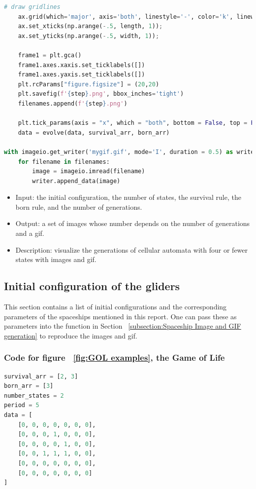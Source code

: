 \documentclass[12pt]{article}
\numberwithin{figure}{section} %
\begin{document}
\begin{lstlisting}[language = Python]
    # draw gridlines
    ax.grid(which='major', axis='both', linestyle='-', color='k', linewidth=2)
    ax.set_xticks(np.arange(-.5, length, 1));
    ax.set_yticks(np.arange(-.5, width, 1));

    frame1 = plt.gca()
    frame1.axes.xaxis.set_ticklabels([])
    frame1.axes.yaxis.set_ticklabels([])
    plt.rcParams["figure.figsize"] = (20,20)
    plt.savefig(f'{step}.png', bbox_inches='tight')
    filenames.append(f'{step}.png')
    
    plt.tick_params(axis = "x", which = "both", bottom = False, top = False)
    data = evolve(data, survival_arr, born_arr)

with imageio.get_writer('mygif.gif', mode='I', duration = 0.5) as writer:
    for filename in filenames:
        image = imageio.imread(filename)
        writer.append_data(image)
\end{lstlisting}
\vspace{-1.5em}
\begin{itemize}[leftmargin = 0.5cm, topsep=0pt,itemsep=-1ex,partopsep=1ex,parsep=1ex]
\item Input: the initial configuration, the number of states, the survival rule, the born rule, and the number of generations. 
\item Output: a set of images whose number depends on the number of generations and a gif. 
\item Description: visualize the generations of cellular automata with four or fewer states with images and gif. 
\end{itemize}

\subsection{Initial configuration of the gliders}
\label{subsection:Initial configuration of the spaceships}
This section contains a list of initial configurations and the corresponding parameters of the spaceships mentioned in this report. One can pass these as parameters into the function in Section ~\ref{subsection:Spaceship Image and GIF generation} to reproduce the images and gif. 

\subsubsection{Code for figure ~\ref{fig:GOL examples}, the Game of Life}
\label{subsubsection:GOL}
\begin{lstlisting}[language = Python]
survival_arr = [2, 3]
born_arr = [3]
number_states = 2
period = 5
data = [
    [0, 0, 0, 0, 0, 0, 0],
    [0, 0, 0, 1, 0, 0, 0],
    [0, 0, 0, 0, 1, 0, 0],
    [0, 0, 1, 1, 1, 0, 0],
    [0, 0, 0, 0, 0, 0, 0],
    [0, 0, 0, 0, 0, 0, 0]   
]
\end{lstlisting}
\end{document}
